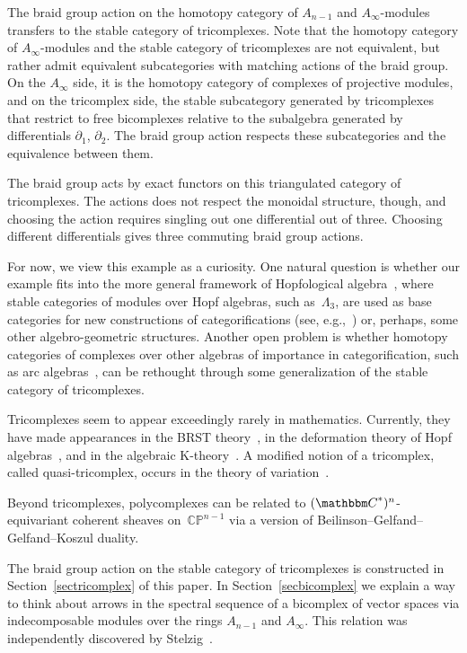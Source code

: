 \documentclass[10pt,a4paper]{amsart}
\theoremstyle{definition}
\numberwithin{equation}{section}
\def\C{{\mathbbm C}}
\begin{document}
The braid group action on the homotopy category of $A_{n-1}$ and $A_{\infty}$-modules transfers to the stable category of tricomplexes. Note that the homotopy category of $A_{\infty}$-modules and the stable category of tricomplexes are not equivalent, but rather admit equivalent subcategories with matching actions of the braid group. On the $A_{\infty}$ side, it is the homotopy category of complexes of projective modules, and on the tricomplex side, the stable subcategory generated by tricomplexes that restrict to free bicomplexes relative to the subalgebra generated by differentials $\partial_1$, $\partial_2$.
The braid group action respects these subcategories and the equivalence between them.

The braid group acts by exact functors on this triangulated category of tricomplexes. The actions does not respect the monoidal structure, though, and choosing the action requires singling out one differential out of three. Choosing different differentials gives three commuting braid group actions.

For now, we view this example as a curiosity. One natural question is whether our example fits into the more general framework of Hopfological algebra~\cite{Kh3,Q}, where stable categories of modules over Hopf algebras, such as~$\Lambda_3$, are used as base categories for new constructions of categorifications (see, e.g.,~\cite{KQ}) or, perhaps, some other algebro-geometric structures. Another open problem is whether homotopy categories of complexes over other algebras of importance in categorification, such as arc algebras~\cite{Kh2}, can be rethought through some generalization of the stable category of tricomplexes.

Tricomplexes seem to appear exceedingly rarely in mathematics. Currently, they have made appearances in the BRST theory~\cite{Sh}, in the deformation theory of Hopf algebras~\cite{Y}, and in the algebraic K-theory~\cite{Ca}. A modified notion of a tricomplex, called quasi-tricomplex, occurs in the theory of variation~\cite{O}.

Beyond tricomplexes, polycomplexes can be related to $(\C^{\ast})^n$-equivariant coherent sheaves on~$\mathbb{CP}^{n-1}$ via a version of Beilinson--Gelfand--Gelfand--Koszul duality.

The braid group action on the stable category of tricomplexes is constructed in Section~\ref{sectricomplex} of this paper. In Section~\ref{secbicomplex} we explain a way to think about arrows in the spectral sequence of a bicomplex of vector spaces via indecomposable modules over the rings $A_{n-1}$ and $A_{\infty}$. This relation was independently discovered by Stelzig~\cite{St-2018}.
\end{document}
